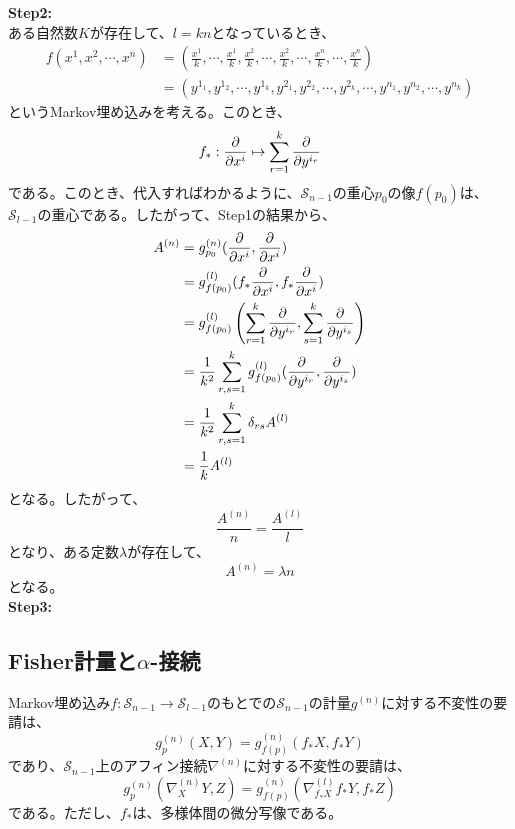 \documentclass[a4paper,11pt]{jsarticle}
\numberwithin{equation}{section}
\begin{document}
\textbf{Step2:}\\
ある自然数$K$が存在して、$l = kn$となっているとき、
\begin{align}
    f(x^1,x^2,\cdots,x^n) &= \left(\frac{x^1}{k},\cdots,\frac{x^1}{k},\frac{x^2}{k},\cdots,\frac{x^2}{k},\cdots,\frac{x^n}{k},\cdots,\frac{x^n}{k}\right)\\
    &= (y^{1_1},y^{1_2},\cdots,y^{1_k},y^{2_1},y^{2_2},\cdots,y^{2_k},\cdots,y^{n_1},y^{n_2},\cdots,y^{n_k})
\end{align}
というMarkov埋め込みを考える。このとき、
\begin{equation}
    f_* : \pdv{x^i} \mapsto \sum_{r=1}^{k} \pdv{y^{i_r}}
\end{equation}
である。このとき、代入すればわかるように、$\mathcal{S}_{n-1}$の重心$p_0$の像$f(p_0)$は、$\mathcal{S}_{l-1}$の重心である。したがって、Step1の結果から、
\begin{align}
    A^{(n)} &= g^{(n)}_{p_0}(\pdv{x^i},\pdv{x^i})\\
    &= g_{f(p_0)}^{(l)}(f_*\pdv{x^i},f_*\pdv{x^i})\\
    &= g_{f(p_0)}^{(l)}\left(\sum_{r=1}^{k} \pdv{y^{i_r}},\sum_{s=1}^{k} \pdv{y^{i_s}}\right)\\
    &= \frac{1}{k^2} \sum_{r,s=1}^{k} g_{f(p_0)}^{(l)}(\pdv{y^{i_r}},\pdv{y^{i_s}})\\
    &= \frac{1}{k^2} \sum_{r,s=1}^{k} \delta_{rs} A^{(l)}\\
    &= \frac{1}{k} A^{(l)}
\end{align}
となる。したがって、
\begin{equation}
    \frac{A^{(n)}}{n} = \frac{A^{(l)}}{l}
\end{equation}
となり、ある定数$\lambda$が存在して、
\begin{equation}
    A^{(n)} = \lambda n
\end{equation}
となる。\\

\textbf{Step3:}\\

\subsection{Fisher計量と$\alpha$-接続}
Markov埋め込み$f: \mathcal{S}_{n-1} \to \mathcal{S}_{l-1}$のもとでの$\mathcal{S}_{n-1}$の計量$g^{(n)}$に対する不変性の要請は、
\begin{equation}
    \label{eq:1}
    g^{(n)}_p(X,Y) = g^{(n)}_{f(p)}(f_*X,f_*Y)
\end{equation}
であり、$\mathcal{S}_{n-1}$上のアフィン接続$\nabla^{(n)}$に対する不変性の要請は、
\begin{equation}
    \label{eq:2}
    g^{(n)}_p(\nabla^{(n)}_X Y,Z) = g^{(n)}_{f(p)}(\nabla^{(l)}_{f_*X} f_*Y,f_*Z)
\end{equation}
である。ただし、$f_*$は、多様体間の微分写像である。\\
\end{document}
